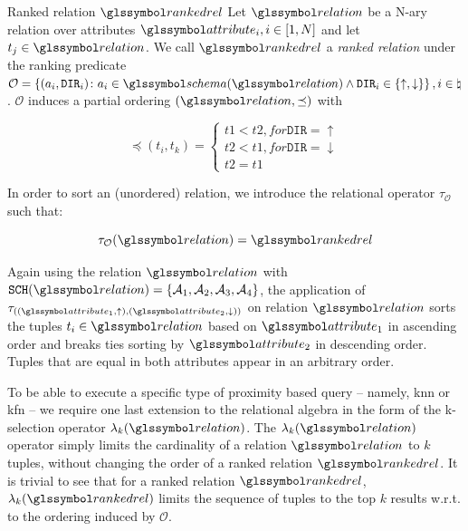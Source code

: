 \begin{definition}[label=definition:ranked_relation]{Ranked relation $\rankedrel$}{}
Let $\relation$ be a N-ary relation over attributes $\attribute_i, i \in \left[ 1,N \right]$ and let $t_j \in \relation$. We  call $\rankedrel$ a \emph{ranked relation} under the ranking predicate $\mathcal{O} = \left \{ (a_i,\mathtt{DIR}_i) \colon a_i \in \schema(\relation) \wedge \mathtt{DIR}_i \in \left\{ \uparrow, \downarrow \right\} \right \}, i \in \natural$. $\mathcal{O}$ induces a partial ordering $(\relation, \preceq)$ with


\begin{equation}
    \preceq (t_i, t_k)=
    \begin{cases}
    t1 < t2, for \mathtt{DIR} = \uparrow \\
    t2 < t1, for \mathtt{DIR} = \downarrow \\
    t2 = t1
    \end{cases}
\end{equation}

\end{definition}

In order to sort an (unordered) relation, we introduce the relational operator $\tau_{\mathcal{O}}$ such that:

\begin{equation}
    \label{equation:rel_alg_tau}
    \tau_{\mathcal{O}}(\relation) = \rankedrel
\end{equation}

Again using the relation $\relation$ with $\mathtt{SCH}(\relation) = \{ \mathcal{A}_1, \mathcal{A}_2, \mathcal{A}_3, \mathcal{A}_4 \}$, the application of $\tau_{((\attribute_1,\uparrow),(\attribute_2,\downarrow))}$ on relation $\relation$ sorts the tuples $t_i \in \relation$ based on $\attribute_1$ in ascending order and breaks ties sorting by $\attribute_2$ in descending order. Tuples that are equal in both attributes appear in an arbitrary order.

To be able to execute a specific type of proximity based query -- namely, \acrshort{knn} or \acrshort{kfn} -- we require one last extension to the relational algebra in the form of the k-selection operator $\lambda_k(\relation)$. The $\lambda_k(\relation)$ operator simply limits the cardinality of a relation $\relation$ to $k$ tuples, without changing the order of a ranked relation $\rankedrel$. It is trivial to see that for a ranked relation $\rankedrel$, $\lambda_k(\rankedrel)$ limits the sequence of tuples to the top $k$ results w.r.t. to the ordering induced by $\mathcal{O}$.

